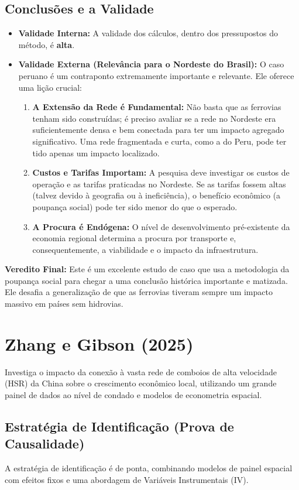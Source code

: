 \documentclass[12pt, a4paper]{article}
\begin{document}
\subsection{Conclusões e a Validade}
\begin{itemize}
    \item \textbf{Validade Interna:} A validade dos cálculos, dentro dos pressupostos do método, é \textbf{alta}.
    \item \textbf{Validade Externa (Relevância para o Nordeste do Brasil):} O caso peruano é um contraponto extremamente importante e relevante. Ele oferece uma lição crucial:
        \begin{enumerate}
            \item \textbf{A Extensão da Rede é Fundamental:} Não basta que as ferrovias tenham sido construídas; é preciso avaliar se a rede no Nordeste era suficientemente densa e bem conectada para ter um impacto agregado significativo. Uma rede fragmentada e curta, como a do Peru, pode ter tido apenas um impacto localizado.
            \item \textbf{Custos e Tarifas Importam:} A pesquisa deve investigar os custos de operação e as tarifas praticadas no Nordeste. Se as tarifas fossem altas (talvez devido à geografia ou à ineficiência), o benefício econômico (a poupança social) pode ter sido menor do que o esperado.
            \item \textbf{A Procura é Endógena:} O nível de desenvolvimento pré-existente da economia regional determina a procura por transporte e, consequentemente, a viabilidade e o impacto da infraestrutura.
        \end{enumerate}
\end{itemize}

\noindent\textbf{Veredito Final:} Este é um excelente estudo de caso que usa a metodologia da poupança social para chegar a uma conclusão histórica importante e matizada. Ele desafia a generalização de que as ferrovias tiveram sempre um impacto massivo em países sem hidrovias.

\section{Zhang e Gibson (2025)}
Investiga o impacto da conexão à vasta rede de comboios de alta velocidade (HSR) da China sobre o crescimento econômico local, utilizando um grande painel de dados ao nível de condado e modelos de econometria espacial.

\subsection{Estratégia de Identificação (Prova de Causalidade)}
A estratégia de identificação é de ponta, combinando modelos de painel espacial com efeitos fixos e uma abordagem de Variáveis Instrumentais (IV).
\end{document}
